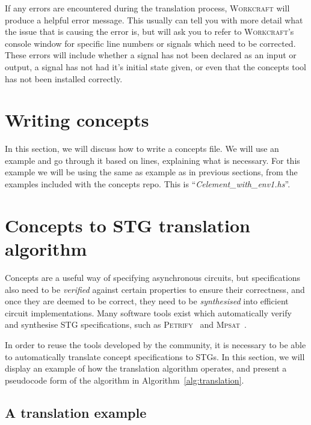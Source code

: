 \documentclass[british,conference,compsoc]{IEEEtran}
\newcommand{\noun}[1]{\textsc{#1}}
\begin{document}
If any errors are encountered during the translation process, \noun{Workcraft} will produce a helpful error message. 
This usually can tell you with more detail what the issue that is causing the error is, but will ask you to refer to \noun{Workcraft}'s console window for specific line numbers or signals which 
need to be corrected. 
These errors will include whether a signal has not been declared as an input or output,
a signal has not had it's initial state given, or even that the concepts tool has not been installed correctly. 

\section{Writing concepts \label{sec:concepts_layout}}

In this section, we will discuss how to write a concepts file. 
We will use an example and go through it based on lines, explaining what is necessary. For this example we will be using the same 
as example as in previous sections, from the examples included with the concepts repo. This is ``\emph{Celement\_with\_env1.hs}''.

\section{Concepts to STG translation algorithm\label{sec:algorithm}}

Concepts are a useful way of specifying asynchronous circuits, but
specifications also need to be \emph{verified} against certain properties to
ensure their correctness, and once they are deemed to be correct, they need to
be \emph{synthesised} into efficient circuit implementations. Many software
tools exist which automatically verify and synthesise STG specifications,
such as \noun{Petrify}~\cite{Cortadella} and
\noun{Mpsat}~\cite{khomenko2004detecting}.

In order to reuse the tools developed by the community, it is
necessary to be able to automatically translate concept specifications to STGs.
In this section, we will display an example of how the translation algorithm 
operates, and present a pseudocode form of the algorithm in Algorithm~\ref{alg:translation}. 


\subsection{A translation example}
\end{document}
